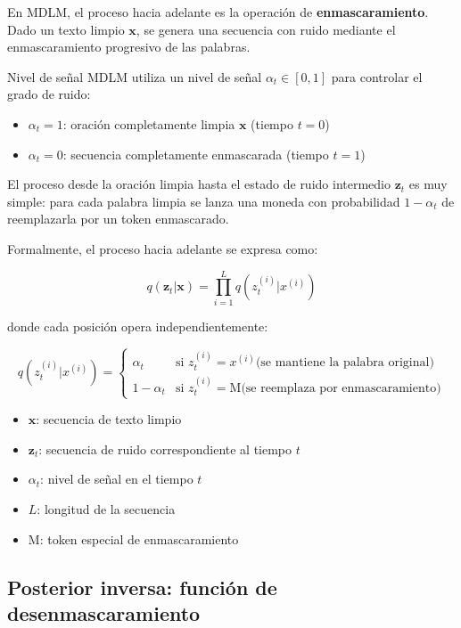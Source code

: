 \documentclass[a4paper]{article}
\begin{document}
En MDLM, el proceso hacia adelante es la operación de \textbf{enmascaramiento}. Dado un texto limpio $\mathbf{x}$, se genera una secuencia con ruido mediante el enmascaramiento progresivo de las palabras.

\begin{importantbox}{Nivel de señal}
MDLM utiliza un nivel de señal $\alpha_t \in [0, 1]$ para controlar el grado de ruido:
\begin{itemize}
    \item $\alpha_t = 1$: oración completamente limpia $\mathbf{x}$ (tiempo $t = 0$)
    \item $\alpha_t = 0$: secuencia completamente enmascarada (tiempo $t = 1$)
\end{itemize}
El proceso desde la oración limpia hasta el estado de ruido intermedio $\mathbf{z}_t$ es muy simple: para cada palabra limpia se lanza una moneda con probabilidad $1 - \alpha_t$ de reemplazarla por un token enmascarado.
\end{importantbox}

Formalmente, el proceso hacia adelante se expresa como:

$$q(\mathbf{z}_t | \mathbf{x}) = \prod_{i=1}^{L} q(z_t^{(i)} | x^{(i)})$$

donde cada posición opera independientemente:

$$q(z_t^{(i)} | x^{(i)}) = \begin{cases} \alpha_t & \text{si } z_t^{(i)} = x^{(i)} \text{(se mantiene la palabra original)} \\ 1 - \alpha_t & \text{si } z_t^{(i)} = \text{M} \text{(se reemplaza por enmascaramiento)} \end{cases}$$

\begin{itemize}
    \item $\mathbf{x}$: secuencia de texto limpio
    \item $\mathbf{z}_t$: secuencia de ruido correspondiente al tiempo $t$
    \item $\alpha_t$: nivel de señal en el tiempo $t$
    \item $L$: longitud de la secuencia
    \item M: token especial de enmascaramiento
\end{itemize}

\subsection{Posterior inversa: función de desenmascaramiento}
\end{document}
